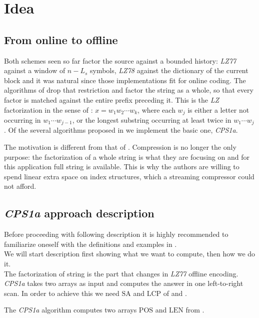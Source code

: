 \section{Idea}

\subsection{From online to offline}
Both schemes seen so far factor the source against a bounded history: \emph{LZ77} against a window of \(n - L_s\) symbols, \emph{LZ78} against the dictionary of the current block and it was natural since those implementations fit for online coding. The algorithms of \cite{chen2008} drop that restriction and factor the string as a whole, so that every factor is matched against the entire prefix preceding it. This is the \emph{LZ} factorization in the sense of : \(x = w_1 w_2 \cdots w_k\), where each \(w_j\) is either a letter not occurring in \(w_1 \cdots w_{j-1}\), or the longest substring occurring at least twice in \(w_1 \cdots w_j\). Of the several algorithms proposed in \cite{chen2008} we implement the basic one, \emph{CPS1a}.

The motivation is different from that of \cite{ziv1977}. Compression is no longer the only purpose: the factorization of a whole string is what they are focusing on and for this application full string is available. This is why the authors are willing to spend linear extra space on index structures, which a streaming compressor could not afford.

\subsection{\emph{CPS1a} approach description}

Before proceeding with following description it is highly recommended to familiarize oneself with the definitions and examples in .
\\

We will start description first showing what we want to compute, then how we do it.
\\
The factorization of string is the part that changes in \emph{LZ77} offline encoding. \emph{CPS1a} takes two arrays as input and computes the answer in one left-to-right scan. In order to achieve this we need \(\mathrm{SA}\) and \(\mathrm{LCP}\) of  and .

The \emph{CPS1a} algorithm computes two arrays \(\mathrm{POS}\) and \(\mathrm{LEN}\) from .


